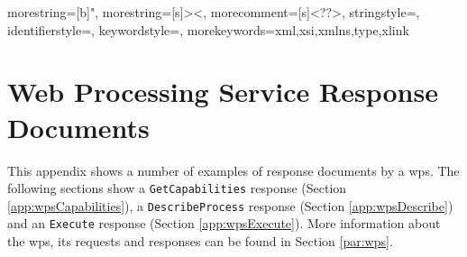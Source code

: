
{
	morestring=[b]",
	morestring=[s]{>}{<},
	morecomment=[s]{<?}{?>},
	stringstyle=\color{black},
	identifierstyle=\color{darkblue},
	keywordstyle=\color{cyan},
	morekeywords={xml,xsi,xmlns,type,xlink}%
}


\chapter{Web Processing Service Response Documents}
\label{app:WPS}

This appendix shows a number of examples of response documents by a \acf{wps}. The following sections show a \texttt{GetCapabilities} response (Section \ref{app:wpsCapabilities}), a \texttt{DescribeProcess} response (Section \ref{app:wpsDescribe}) and an \texttt{Execute} response (Section \ref{app:wpsExecute}). More information about the \ac{wps}, its requests and responses can be found in Section \ref{par:wps}.

